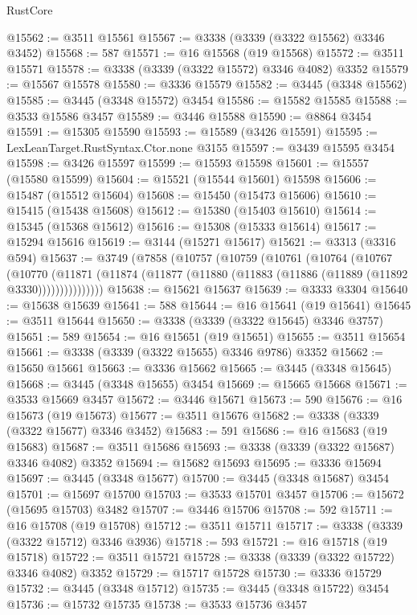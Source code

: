 \begin{lexlean}{RustCore}
\begin{coremodule}
@15562 := @3511 @15561
@15567 := @3338 (@3339 (@3322 @15562) @3346 @3452)
@15568 := 587
@15571 := @16 @15568 (@19 @15568)
@15572 := @3511 @15571
@15578 := @3338 (@3339 (@3322 @15572) @3346 @4082) @3352
@15579 := @15567 @15578
@15580 := @3336 @15579
@15582 := @3445 (@3348 @15562)
@15585 := @3445 (@3348 @15572) @3454
@15586 := @15582 @15585
@15588 := @3533 @15586 @3457
@15589 := @3446 @15588
@15590 := @8864 @3454
@15591 := @15305 @15590
@15593 := @15589 (@3426 @15591)
@15595 := LexLeanTarget.RustSyntax.Ctor.none @3155
@15597 := @3439 @15595 @3454
@15598 := @3426 @15597
@15599 := @15593 @15598
@15601 := @15557 (@15580 @15599)
@15604 := @15521 (@15544 @15601) @15598
@15606 := @15487 (@15512 @15604)
@15608 := @15450 (@15473 @15606)
@15610 := @15415 (@15438 @15608)
@15612 := @15380 (@15403 @15610)
@15614 := @15345 (@15368 @15612)
@15616 := @15308 (@15333 @15614)
@15617 := @15294 @15616
@15619 := @3144 (@15271 @15617)
@15621 := @3313 (@3316 @594)
@15637 := @3749
    (@7858
      (@10757
        (@10759
          (@10761
            (@10764
              (@10767
                (@10770
                  (@11871
                    (@11874 (@11877 (@11880 (@11883 (@11886 (@11889 (@11892 @3330)))))))))))))))
@15638 := @15621 @15637
@15639 := @3333 @3304
@15640 := @15638 @15639
@15641 := 588
@15644 := @16 @15641 (@19 @15641)
@15645 := @3511 @15644
@15650 := @3338 (@3339 (@3322 @15645) @3346 @3757)
@15651 := 589
@15654 := @16 @15651 (@19 @15651)
@15655 := @3511 @15654
@15661 := @3338 (@3339 (@3322 @15655) @3346 @9786) @3352
@15662 := @15650 @15661
@15663 := @3336 @15662
@15665 := @3445 (@3348 @15645)
@15668 := @3445 (@3348 @15655) @3454
@15669 := @15665 @15668
@15671 := @3533 @15669 @3457
@15672 := @3446 @15671
@15673 := 590
@15676 := @16 @15673 (@19 @15673)
@15677 := @3511 @15676
@15682 := @3338 (@3339 (@3322 @15677) @3346 @3452)
@15683 := 591
@15686 := @16 @15683 (@19 @15683)
@15687 := @3511 @15686
@15693 := @3338 (@3339 (@3322 @15687) @3346 @4082) @3352
@15694 := @15682 @15693
@15695 := @3336 @15694
@15697 := @3445 (@3348 @15677)
@15700 := @3445 (@3348 @15687) @3454
@15701 := @15697 @15700
@15703 := @3533 @15701 @3457
@15706 := @15672 (@15695 @15703) @3482
@15707 := @3446 @15706
@15708 := 592
@15711 := @16 @15708 (@19 @15708)
@15712 := @3511 @15711
@15717 := @3338 (@3339 (@3322 @15712) @3346 @3936)
@15718 := 593
@15721 := @16 @15718 (@19 @15718)
@15722 := @3511 @15721
@15728 := @3338 (@3339 (@3322 @15722) @3346 @4082) @3352
@15729 := @15717 @15728
@15730 := @3336 @15729
@15732 := @3445 (@3348 @15712)
@15735 := @3445 (@3348 @15722) @3454
@15736 := @15732 @15735
@15738 := @3533 @15736 @3457

\end{coremodule}
\end{lexlean}
